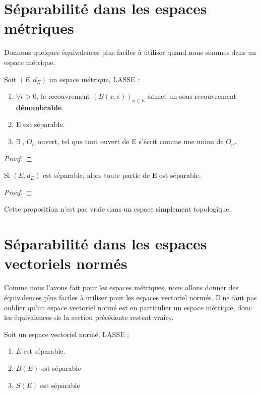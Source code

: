\section{Séparabilité dans les espaces métriques}

Donnons quelques équivalences plus faciles à utiliser quand nous sommes dans un
espace métrique.

\begin{proposition}
	Soit $(E, d_{E})$ un espace métrique, LASSE :
	\begin{enumerate}
		\item $\forall \epsilon > 0$, le recouvrement $(B(x, \epsilon))_{x \in
			E}$ admet un sous-recouvrement \textbf{dénombrable}.
		\item E est séparable.
		\item $\exists$ , $O_{n}$ ouvert, tel que
			tout ouvert de E s'écrit comme une union de $O_{n}$.
	\end{enumerate}
\end{proposition}

\begin{proof}
	
\end{proof}

\begin{proposition}
	Si $(E, d_{E})$ est séparable, alors toute partie de E est séparable.
\end{proposition}

\begin{proof}
	
\end{proof}

\begin{remarque}
	Cette proposition n'est pas vraie dans un espace simplement topologique.
\end{remarque}

\section{Séparabilité dans les espaces vectoriels normés}

Comme nous l'avons fait pour les espaces métriques, nous allons donner des
équivalences plus faciles à utiliser pour les espaces vectoriel normés. Il ne
faut pas oublier qu'un espace vectoriel normé est en particulier un espace
métrique, donc les équivalences de la section précédente restent vraies.

\begin{proposition}
	Soit  un espace vectoriel normé, LASSE :
	\begin{enumerate}
		\item $E$ est séparable.
		\item $B(E)$ est séparable
		\item $S(E)$ est séparable
	\end{enumerate}
\end{proposition}

